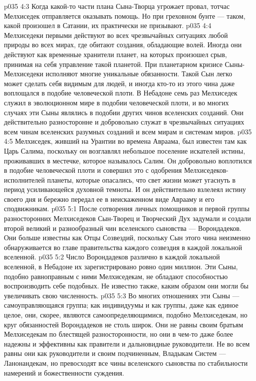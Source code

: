 \vs p035 4:3 Когда какой\hyp{}то части плана Сына\hyp{}Творца угрожает провал, тотчас Мелхиседек отправляется оказывать помощь. Но при греховном бунте --- таком, какой произошел в Сатании, их практически не призывают.
\vs p035 4:4 Мелхиседеки первыми действуют во всех чрезвычайных ситуациях любой природы во всех мирах, где обитают создания, обладающие волей. Иногда они действуют как временные хранители планет, на которых произошел срыв, принимая на себя управление такой планетой. При планетарном кризисе Сыны\hyp{}Мелхиседеки исполняют многие уникальные обязанности. Такой Сын легко может сделать себя видимым для людей, и иногда кто\hyp{}то из этого чина даже воплощался в подобие человеческой плоти. В Небадоне семь раз Мелхиседек служил в эволюционном мире в подобии человеческой плоти, и во многих случаях эти Сыны являлись в подобии других чинов вселенских созданий. Они действительно разносторонне и добровольно служат в чрезвычайных ситуациях всем чинам вселенских разумных созданий и всем мирам и системам миров.
\vs p035 4:5 \pc Мелхиседек, живший на Урантии во времена Авраама, был известен там как Царь Салима, поскольку он возглавлял небольшое поселение искателей истины, проживавших в местечке, которое называлось Салим. Он добровольно воплотился в подобие человеческой плоти и совершил это с одобрения Мелхиседеков\hyp{}исполнителей планеты, которые опасались, что свет жизни может угаснуть в период усиливающейся духовной темноты. И он действительно взлелеял истину своего дня и бережно передал ее в неискаженном виде Аврааму и его сподвижникам.
\vs p035 5:1 После сотворения личных помощников и первой группы разносторонних Мелхиседеков Сын\hyp{}Творец и Творческий Дух задумали и создали второй великий и разнообразный чин вселенского сыновства --- Ворондадеков. Они больше известны как Отцы Созвездий, поскольку Сын этого чина неизменно обнаруживается во главе правительства каждого созвездия в каждой локальной вселенной.
\vs p035 5:2 \pc Число Ворондадеков различно в каждой локальной вселенной, в Небадоне их зарегистрировано ровно один миллион. Эти Сыны, подобно равноправным с ними Мелхиседекам, не обладают способностью воспроизводить себе подобных. Не известно также, каким образом они могли бы увеличивать свою численность.
\vs p035 5:3 \pc Во многих отношениях эти Сыны --- самоуправляющаяся группа; как индивидуумы и как группы, даже как единое целое, они, скорее, являются самоопределяющимися, подобно Мелхиседекам, но круг обязанностей Ворондадеков не столь широк. Они не равны своим братьям Мелхиседекам по блестящей разносторонности, но они в чем\hyp{}то даже более надежны и эффективны как правители и дальновидные руководители. Не во всем равны они как руководители и своим подчиненным, Владыкам Систем --- Ланонандекам, но превосходят все чины вселенского сыновства по стабильности намерений и божественности суждения.
